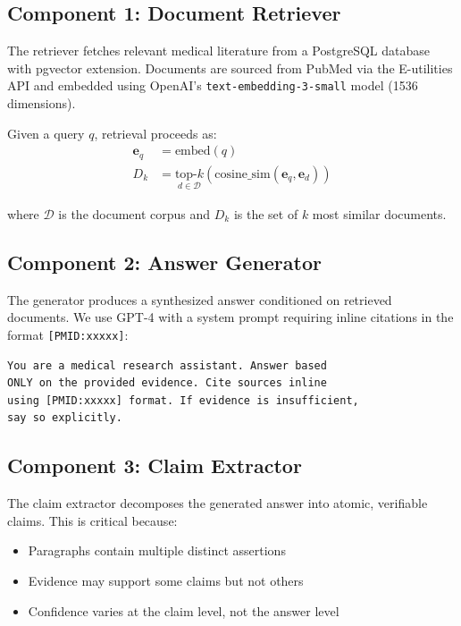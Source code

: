\documentclass[11pt,a4paper]{article}
\begin{document}
\subsection{Component 1: Document Retriever}

The retriever fetches relevant medical literature from a PostgreSQL database with pgvector extension. Documents are sourced from PubMed via the E-utilities API and embedded using OpenAI's \texttt{text-embedding-3-small} model (1536 dimensions).

Given a query $q$, retrieval proceeds as:
\begin{align}
    \mathbf{e}_q &= \text{embed}(q) \\
    D_k &= \underset{d \in \mathcal{D}}{\text{top-}k} \left( \text{cosine\_sim}(\mathbf{e}_q, \mathbf{e}_d) \right)
\end{align}

where $\mathcal{D}$ is the document corpus and $D_k$ is the set of $k$ most similar documents.

\subsection{Component 2: Answer Generator}

The generator produces a synthesized answer conditioned on retrieved documents. We use GPT-4 with a system prompt requiring inline citations in the format \texttt{[PMID:xxxxx]}:

\begin{lstlisting}
You are a medical research assistant. Answer based 
ONLY on the provided evidence. Cite sources inline 
using [PMID:xxxxx] format. If evidence is insufficient, 
say so explicitly.
\end{lstlisting}

\subsection{Component 3: Claim Extractor}

The claim extractor decomposes the generated answer into atomic, verifiable claims. This is critical because:

\begin{itemize}
    \item Paragraphs contain multiple distinct assertions
    \item Evidence may support some claims but not others
    \item Confidence varies at the claim level, not the answer level
\end{itemize}
\end{document}
